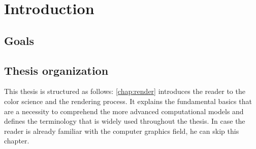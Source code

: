 \chapter*{Introduction}

\section*{Goals}

\section*{Thesis organization}

This thesis is structured as follows: \autoref{chap:render} introduces the reader to the color science and the rendering process. It explains the fundamental basics that are a necessity to comprehend the more advanced computational models and defines the terminology that is widely used throughout the thesis. In case the reader is already familiar with the computer graphics field, he can skip this chapter.

